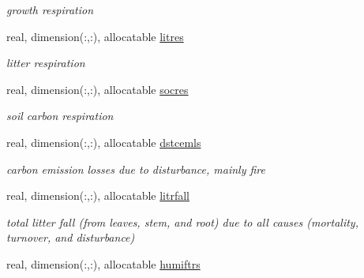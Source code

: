 \begin{DoxyCompactItemize}
\begin{DoxyCompactList}\small\item\em growth respiration \end{DoxyCompactList}\item 
\hypertarget{structctem__statevars_1_1veg__rot_a2a4438301aa9f1920c70cd055ac0c64e}{}real, dimension(\+:,\+:), allocatable \hyperlink{structctem__statevars_1_1veg__rot_a2a4438301aa9f1920c70cd055ac0c64e}{litres}\label{structctem__statevars_1_1veg__rot_a2a4438301aa9f1920c70cd055ac0c64e}

\begin{DoxyCompactList}\small\item\em litter respiration \end{DoxyCompactList}\item 
\hypertarget{structctem__statevars_1_1veg__rot_a3f598f54757f46f491e8b9a290f39cfe}{}real, dimension(\+:,\+:), allocatable \hyperlink{structctem__statevars_1_1veg__rot_a3f598f54757f46f491e8b9a290f39cfe}{socres}\label{structctem__statevars_1_1veg__rot_a3f598f54757f46f491e8b9a290f39cfe}

\begin{DoxyCompactList}\small\item\em soil carbon respiration \end{DoxyCompactList}\item 
\hypertarget{structctem__statevars_1_1veg__rot_a6482d0537788504ffcb6e0ebfe355243}{}real, dimension(\+:,\+:), allocatable \hyperlink{structctem__statevars_1_1veg__rot_a6482d0537788504ffcb6e0ebfe355243}{dstcemls}\label{structctem__statevars_1_1veg__rot_a6482d0537788504ffcb6e0ebfe355243}

\begin{DoxyCompactList}\small\item\em carbon emission losses due to disturbance, mainly fire \end{DoxyCompactList}\item 
\hypertarget{structctem__statevars_1_1veg__rot_ac6480cd6c98f68577256aeb75d6dfdbd}{}real, dimension(\+:,\+:), allocatable \hyperlink{structctem__statevars_1_1veg__rot_ac6480cd6c98f68577256aeb75d6dfdbd}{litrfall}\label{structctem__statevars_1_1veg__rot_ac6480cd6c98f68577256aeb75d6dfdbd}

\begin{DoxyCompactList}\small\item\em total litter fall (from leaves, stem, and root) due to all causes (mortality, turnover, and disturbance) \end{DoxyCompactList}\item 
\hypertarget{structctem__statevars_1_1veg__rot_afe65c220ae2540926382da8ec6cf548a}{}real, dimension(\+:,\+:), allocatable \hyperlink{structctem__statevars_1_1veg__rot_afe65c220ae2540926382da8ec6cf548a}{humiftrs}\label{structctem__statevars_1_1veg__rot_afe65c220ae2540926382da8ec6cf548a}


\end{DoxyCompactItemize}

